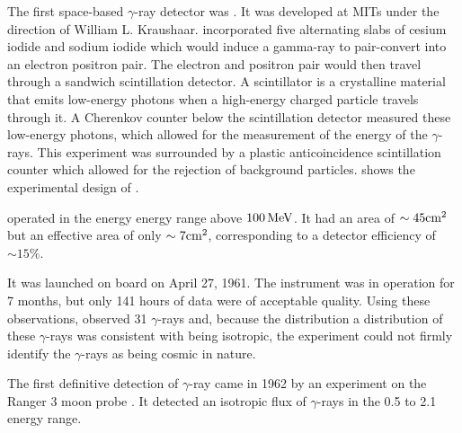 The first space-based $\gamma$-ray detector was \explorerxi
\cite{kraushaar_1965_explorer-experiment}.  It was developed at \acp{MIT}
under the direction of William L. Kraushaar.  
\explorerxi incorporated five alternating slabs of cesium iodide and sodium
iodide which would induce a gamma-ray to pair-convert into an electron positron
pair. The electron and positron pair would then 
travel through
a sandwich scintillation detector.
A scintillator is a crystalline material that emits low-energy photons
when a high-energy charged particle travels through it.
A Cherenkov counter below the scintillation detector
measured these low-energy photons, which allowed
for the measurement of the energy of the
$\gamma$-rays.
This experiment was surrounded by a plastic anticoincidence
scintillation counter which allowed for the rejection of
background particles. 
shows the experimental design of \explorerxi.


\explorerxi operated in the energy energy range above $100\,\text{MeV}$.
It had an area of $\sim45\text{cm}^2$
but an effective area of only $\sim 7\text{cm}^2$, corresponding
to a detector efficiency of $\sim 15\%$.

It was launched on board \explorerxi on April 27,
1961. The instrument was in operation for 7 months, but only 141 hours
of data were of acceptable quality.  Using these observations, \explorerxi
observed 31 $\gamma$-rays and, because the distribution a distribution of
these $\gamma$-rays was consistent with being isotropic, the experiment
could not firmly identify the $\gamma$-rays as being cosmic in nature.




The first definitive detection of $\gamma$-ray came in
1962 by an experiment on the Ranger 3 moon
probe \citep{arnold_1962_gamma-space}.  It detected an isotropic flux
of $\gamma$-rays in the 0.5 \mev to 2.1 \mev energy range.

